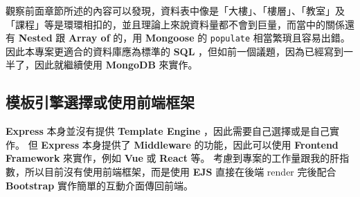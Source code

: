 \documentclass{article}
\begin{document}
觀察前面章節所述的內容可以發現，資料表中像是「大樓」、「樓層」、「教室」及「課程」等是環環相扣的，並且理論上來說資料量都不會到巨量，而當中的關係還有 \textbf{Nested} 跟 \textbf{Array of} 的，用 \textbf{Mongoose} 的 \verb|populate| 相當繁瑣且容易出錯。
因此本專案更適合的資料庫應為標準的 \textbf{SQL} ，但如前一個議題，因為已經寫到一半了，因此就繼續使用 \textbf{MongoDB} 來實作。

\subsection{模板引擎選擇或使用前端框架}

\textbf{Express} 本身並沒有提供 \textbf{Template Engine} ，因此需要自己選擇或是自己實作。
但 \textbf{Express} 本身提供了 \textbf{Middleware} 的功能，因此可以使用 \textbf{Frontend Framework} 來實作，例如 \textbf{Vue} 或 \textbf{React} 等。
考慮到專案的工作量跟我的肝指數，所以目前沒有使用前端框架，而是使用 \textbf{EJS} 直接在後端 render 完後配合 \textbf{Bootstrap} 實作簡單的互動介面傳回前端。
\end{document}
